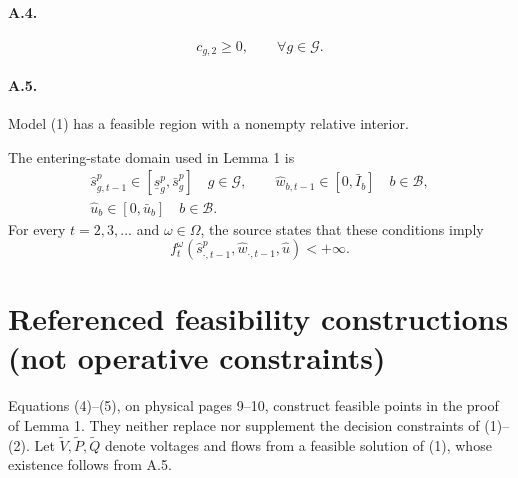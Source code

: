 \documentclass[10pt]{article}
\begin{document}
\paragraph{A.4.}
\begin{equation}
c_{g,2}\geq0,\qquad\forall g\in\mathcal G.\tag{A.4}
\end{equation}
\paragraph{A.5.}
Model (1) has a feasible region with a nonempty relative interior.

The entering-state domain used in Lemma 1 is
\begin{equation}
\begin{gathered}
\hat s_{g,t-1}^p\in[\underline s_g^p,\bar s_g^p]\quad g\in\mathcal G,\qquad
\hat w_{b,t-1}\in[0,\bar I_b]\quad b\in\mathcal B,\\
\hat u_b\in[0,\bar u_b]\quad b\in\mathcal B.
\end{gathered}\tag{3}
\end{equation}
For every $t=2,3,\ldots$ and $\omega\in\Omega$, the source states that these conditions imply
\[
f_t^\omega(\hat s_{\cdot,t-1}^p,\hat w_{\cdot,t-1},\hat u)<+\infty.
\]

\section*{Referenced feasibility constructions (not operative constraints)}
Equations (4)--(5), on physical pages 9--10, construct feasible points in the proof of Lemma 1. They neither replace nor supplement the decision constraints of (1)--(2). Let $\widetilde V,\widetilde P,\widetilde Q$ denote voltages and flows from a feasible solution of (1), whose existence follows from A.5.
\end{document}
